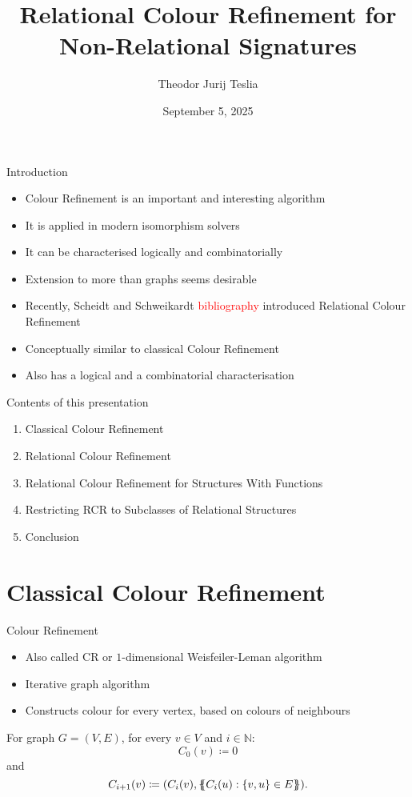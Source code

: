 \documentclass[aspectratio=169]{beamer}
\title{Relational Colour Refinement for Non-Relational Signatures}
\date{September 5, 2025}
\author{Theodor Jurij Teslia}
\institute{RWTH Aachen University}
\def\multiset#1{\ensuremath{\left\{\kern-.35em\left\{#1\right\}\kern-.35em\right\}}}
\begin{document}
	
	\maketitle
	
	\begin{frame}{Introduction}
		\begin{itemize}
			\item Colour Refinement is an important and interesting algorithm
			\item It is applied in modern isomorphism solvers
			\item It can be characterised logically and combinatorially
			\item Extension to more than graphs seems desirable
			\item Recently, Scheidt and Schweikardt \textcolor{red}{bibliography} introduced Relational Colour Refinement
			\item Conceptually similar to classical Colour Refinement
			\item Also has a logical and a combinatorial characterisation
		\end{itemize}
	\end{frame}
	
	\begin{frame}{Contents of this presentation}
		\begin{enumerate}
			\item Classical Colour Refinement
			\item Relational Colour Refinement
			\item Relational Colour Refinement for Structures With Functions
			\item Restricting RCR to Subclasses of Relational Structures
			\item Conclusion
		\end{enumerate}
	\end{frame}
	
	\section{Classical Colour Refinement}
	
	\begin{frame}{Colour Refinement}
		\begin{itemize}
			\item Also called CR or $1$-dimensional Weisfeiler-Leman algorithm
			\item Iterative graph algorithm
			\item Constructs colour for every vertex, based on colours of neighbours
		\end{itemize}
		
		\begin{definition}
			For graph $G=(V,E)$, for every $v\in V$ and $i\in \mathbb N$:
			$$C_0(v)\coloneqq 0$$ and $$C_{i+1}(v)\coloneqq(C_i(v),\multiset{C_i(u) : \{v,u\}\in E}).$$
		\end{definition}
	\end{frame}
	
\end{document}
